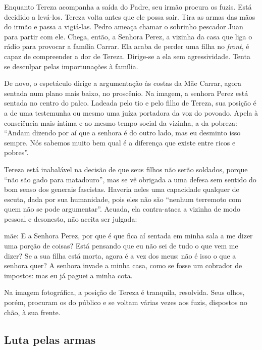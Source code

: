 {Enquanto Tereza acompanha a saída do Padre, seu irmão procura os fuzis.
Está decidido a levá-los. Tereza volta antes que ele possa sair. Tira as
armas das mãos do irmão e passa a vigiá-las. Pedro ameaça chamar o
sobrinho pescador Juan para partir com ele. Chega, então, a Senhora
Perez, a vizinha da casa que liga o rádio para provocar a família
Carrar. Ela acaba de perder uma filha no {\it front}, é capaz de
compreender a dor de Tereza. Dirige-se a ela sem agressividade. Tenta se
desculpar pelas importunações à família.

De novo, o espetáculo dirige a argumentação às costas da Mãe Carrar,
agora sentada num plano mais baixo, no proscênio. Na imagem, a senhora
Perez está sentada no centro do palco. Ladeada pelo tio e pelo filho de
Tereza, sua posição é a de uma testemunha ou mesmo uma juíza portadora
da voz do povoado. Apela à consciência mais íntima e ao mesmo tempo
social da vizinha, a da pobreza: “Andam dizendo por aí que a senhora é
do outro lado, mas eu desminto isso sempre. Nós sabemos muito bem qual é
a diferença que existe entre ricos e pobres”.

Tereza está inabalável na decisão de que seus filhos não serão soldados,
porque “não são gado para matadouro”, mas se vê obrigada a uma defesa
sem sentido do bom senso dos generais fascistas. Haveria neles
uma capacidade qualquer de escuta, dada por sua humanidade, pois eles
não são “nenhum terremoto com quem não se pode argumentar”. Acuada, ela
contra-ataca a vizinha de modo pessoal e desonesto, não aceita ser
julgada:

\startblockquote
{\sc mãe}: E a Senhora Perez, por que é que fica aí sentada em
minha sala a me dizer uma porção de coisas? Está pensando que eu não sei
de tudo o que vem me dizer? Se a sua filha está morta, agora é a vez dos
meus: não é isso o que a senhora quer? A senhora invade a minha casa,
como se fosse um cobrador de impostos: mas eu já paguei a minha cota.
\stopblockquote

Na imagem fotográfica, a posição de Tereza é tranquila, resolvida. Seus
olhos, porém, procuram os do público e se voltam várias vezes aos fuzis,
dispostos no chão, à sua frente.


\subsection{Luta pelas armas}

}
